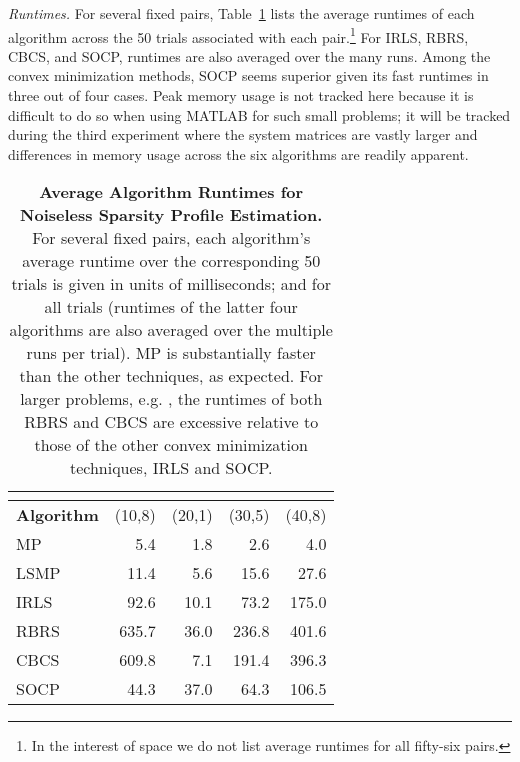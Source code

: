 \documentclass[final]{siamltex}
\begin{document}
   {\em{Runtimes}.} For several fixed  pairs,
   Table~\ref{tab:r1} lists the average runtimes of each algorithm
   across the 50 trials associated with each pair.\footnote{In the
   interest of space we do not list average runtimes for all fifty-six
    pairs.}  For IRLS, RBRS, CBCS, and SOCP, runtimes are also
   averaged over the many  runs.  Among the convex
   minimization methods, SOCP seems superior given its fast runtimes
   in three out of four cases.  Peak memory usage is not tracked here
   because it is difficult to do so when using MATLAB for such small
   problems; it will be tracked during the third experiment where the
   system matrices are vastly larger and differences in memory usage
   across the six algorithms are readily apparent.
   \begin{table}
   \begin{center}
   \small
   \begin{tabular}{|l|r|r|r|r|}
   \hline
                          & \multicolumn{4}{c|}{} \\ \hline
       {\bf{Algorithm}}     & (10,8) & (20,1) & (30,5) & (40,8) \\ \hline
    MP                    & 5.4      & 1.8     & 2.6  & 4.0  \\
    LSMP                  & 11.4     & 5.6     & 15.6 & 27.6 \\
    IRLS  & 92.6     & 10.1    & 73.2  & 175.0 \\
    RBRS  & 635.7    & 36.0    & 236.8 & 401.6 \\
    CBCS  & 609.8    & 7.1     & 191.4 & 396.3 \\
    SOCP  & 44.3     & 37.0    & 64.3  & 106.5 \\ \hline
   \end{tabular}
   \end{center}

   \caption{{\bf{Average Algorithm Runtimes for Noiseless Sparsity
   Profile Estimation.}} For several fixed  pairs, each
   algorithm's average runtime over the corresponding 50 trials is
   given in units of milliseconds;  and  for all trials
   (runtimes of the latter four algorithms are also averaged over the
   multiple  runs per trial).  MP is substantially faster
   than the other techniques, as expected.  For larger problems,
   e.g. , the runtimes of both RBRS and CBCS are
   excessive relative to those of the other convex minimization
   techniques, IRLS and SOCP\@.}  \label{tab:r1}

   \end{table}
\end{document}
